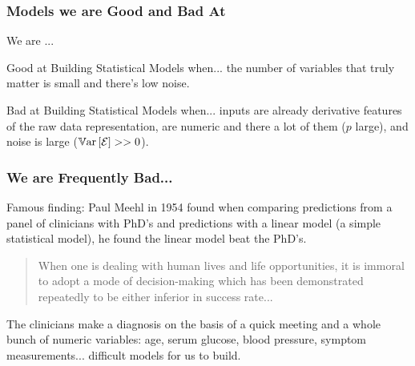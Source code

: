 \documentclass[handout]{beamer}
\begin{document}

\begin{frame}\frametitle{Models we are Good and Bad At}
\small

We are ...

\begin{block}{Good at Building Statistical Models when...} \pause 
the number of variables that truly matter is small and there's low noise. %
\end{block}
	
\begin{block}{Bad at Building Statistical Models when...} \pause 
inputs are already derivative features of the raw data representation, are numeric and there a lot of them ($p$ large), and noise is large ($\mathbb{V}\text{ar}\left[\mathcal{E}\right] >> 0$). %
\end{block}


\end{frame}

\begin{frame}\frametitle{We are Frequently Bad...}

Famous finding: Paul Meehl in 1954 found when comparing predictions from a panel of clinicians with PhD's and predictions with a linear model (a simple statistical model),  \pause he found the linear model beat the PhD's.


\begin{quotation}\footnotesize
When one is dealing with human lives and life opportunities, it is immoral to adopt a mode of decision-making which has been demonstrated repeatedly to be either inferior in success rate...
\end{quotation} \pause 

The clinicians make a diagnosis on the basis of a quick meeting and a whole bunch of numeric variables: age, serum glucose, blood pressure, symptom measurements... difficult models for us to build.

\end{frame}
\end{document}
